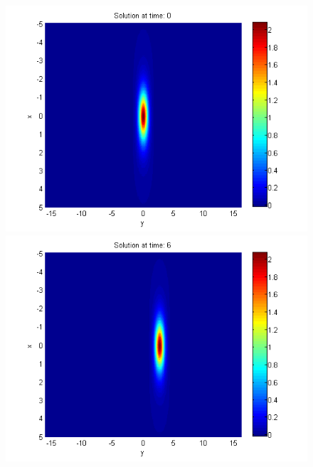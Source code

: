 \documentclass{article}
\begin{document}
\begin{figure}[ht]\vspace{0.2cm}
\centering
	\begin{minipage}[b]{0.30\linewidth}
		\includegraphics[width=\linewidth]{../amitans/figures/solution_30x45_bt3_c045_T0.png}
	\end{minipage}	
	\begin{minipage}[b]{0.30\linewidth}
		\includegraphics[width=\linewidth]{../amitans/figures/solution_30x45_bt3_c045_T6.png}
	\end{minipage}	
	\begin{minipage}[b]{0.30\linewidth}

\end{minipage}
\end{figure}
\end{document}
